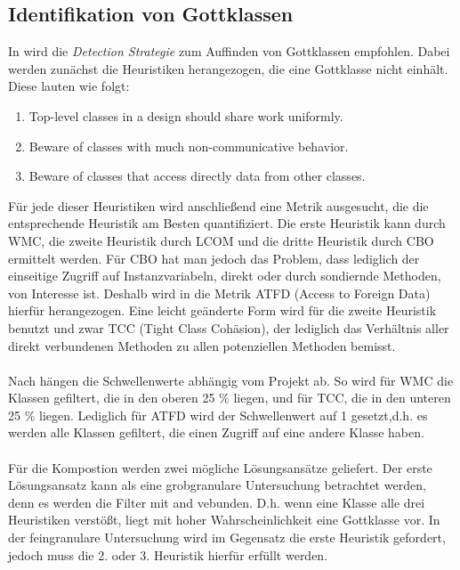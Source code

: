 \documentclass[12pt]{article}
\begin{document}
\subsection{Identifikation von Gottklassen}
\label{sec:Identifikation von Gottklassen}

In \cite{Mar04} wird die \textit{Detection Strategie} zum
Auffinden von Gottklassen empfohlen. Dabei werden zunächst
die Heuristiken herangezogen, die eine Gottklasse nicht einhält.
Diese lauten wie folgt:
\begin{enumerate}
        \item Top-level classes in a design should share work
                uniformly.
        \item Beware of classes with much non-communicative
                behavior.
        \item Beware of classes that access directly data from
                other classes.
\end{enumerate}
Für jede dieser Heuristiken wird anschließend eine Metrik
ausgesucht, die die entsprechende Heuristik am Besten
quantifiziert. Die erste Heuristik kann durch WMC, die zweite
Heuristik durch LCOM und die dritte Heuristik durch CBO ermittelt
werden. Für CBO hat man jedoch das Problem, dass lediglich der
einseitige Zugriff auf Instanzvariabeln, direkt oder durch
sondiernde Methoden, von Interesse ist. Deshalb wird in
\cite{Mar04} die Metrik ATFD (Access to Foreign Data) hierfür
herangezogen. Eine leicht geänderte Form wird für die zweite
Heuristik benutzt und zwar TCC (Tight Class Cohäsion), der
lediglich das Verhältnis aller direkt verbundenen Methoden zu
allen potenziellen Methoden bemisst. 
\\
\\
Nach \cite{Mar04} hängen die Schwellenwerte abhängig vom Projekt
ab. So wird für WMC die Klassen gefiltert, die in den oberen 25
\% liegen, und für TCC, die in den unteren 25 \% liegen.
Lediglich für ATFD wird der Schwellenwert auf 1 gesetzt,d.h. es
werden alle Klassen gefiltert, die einen Zugriff auf eine andere
Klasse haben.
\\
\\
Für die Kompostion werden zwei mögliche Lösungsansätze geliefert.
Der erste Lösungsansatz kann als eine grobgranulare Untersuchung
betrachtet werden, denn es werden die Filter mit \textsf{and}
vebunden. D.h. wenn eine Klasse alle drei Heuristiken verstößt,
liegt mit hoher Wahrscheinlichkeit eine Gottklasse vor.  In der
feingranulare Untersuchung wird im Gegensatz die erste Heuristik
gefordert, jedoch muss die 2. oder 3. Heuristik hierfür erfüllt
werden.
\end{document}
